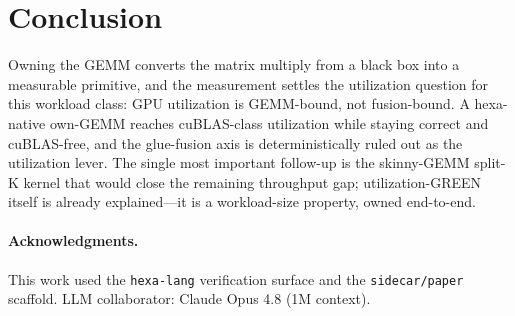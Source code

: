 \documentclass[11pt,a4paper]{article}
\begin{document}
\section{Conclusion}
\label{sec:conclusion}

Owning the GEMM converts the matrix multiply from a black box into a measurable
primitive, and the measurement settles the utilization question for this workload
class: GPU utilization is GEMM-bound, not fusion-bound. A hexa-native own-GEMM
reaches cuBLAS-class utilization while staying correct and cuBLAS-free, and the
glue-fusion axis is deterministically ruled out as the utilization lever. The
single most important follow-up is the skinny-GEMM split-K kernel that would close
the remaining throughput gap; utilization-GREEN itself is already explained---it
is a workload-size property, owned end-to-end.

\paragraph{Acknowledgments.}
This work used the \texttt{hexa-lang} verification surface and the
\texttt{sidecar/paper} scaffold. LLM collaborator: Claude Opus 4.8 (1M context).

\nocite{*}


\end{document}
